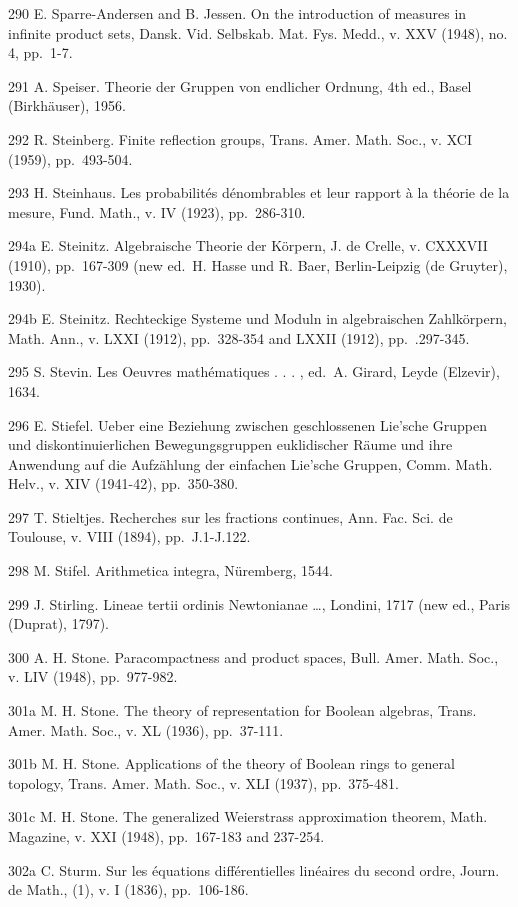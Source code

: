 290 E. Sparre-Andersen and B. Jessen. On the introduction of measures in infinite product sets, Dansk. Vid. Selbskab. Mat. Fys. Medd., v. XXV (1948), no. 4, pp.~1-7.

291 A. Speiser. Theorie der Gruppen von endlicher Ordnung, 4th ed., Basel (Birkhäuser), 1956.

292 R. Steinberg. Finite reflection groups, Trans. Amer. Math. Soc., v. XCI (1959), pp.~493-504.

293 H. Steinhaus. Les probabilités dénombrables et leur rapport à la théorie de la mesure, Fund. Math., v. IV (1923), pp.~286-310.

294a E. Steinitz. Algebraische Theorie der Körpern, J. de Crelle, v. CXXXVII (1910), pp.~167-309 (new ed.~H. Hasse und R. Baer, Berlin-Leipzig (de Gruyter), 1930).

294b E. Steinitz. Rechteckige Systeme und Moduln in algebraischen Zahlkörpern, Math. Ann., v. LXXI (1912), pp.~328-354 and LXXII (1912), pp.~.297-345.

295 S. Stevin. Les Oeuvres mathématiques . . . , ed.~A. Girard, Leyde (Elzevir), 1634.

296 E. Stiefel. Ueber eine Beziehung zwischen geschlossenen Lie'sche Gruppen und diskontinuierlichen Bewegungsgruppen euklidischer Räume und ihre Anwendung auf die Aufzählung der einfachen Lie'sche Gruppen, Comm. Math. Helv., v. XIV (1941-42), pp.~350-380.

297 T. Stieltjes. Recherches sur les fractions continues, Ann. Fac. Sci. de Toulouse, v. VIII (1894), pp.~J.1-J.122.

298 M. Stifel. Arithmetica integra, Nüremberg, 1544.

299 J. Stirling. Lineae tertii ordinis Newtonianae \ldots, Londini, 1717 (new ed., Paris (Duprat), 1797).

300 A. H. Stone. Paracompactness and product spaces, Bull. Amer. Math. Soc., v. LIV (1948), pp.~977-982.

301a M. H. Stone. The theory of representation for Boolean algebras, Trans. Amer. Math. Soc., v. XL (1936), pp.~37-111.

301b M. H. Stone. Applications of the theory of Boolean rings to general topology, Trans. Amer. Math. Soc., v. XLI (1937), pp.~375-481.

301c M. H. Stone. The generalized Weierstrass approximation theorem, Math. Magazine, v. XXI (1948), pp.~167-183 and 237-254.

302a C. Sturm. Sur les équations différentielles linéaires du second ordre, Journ. de Math., (1), v. I (1836), pp.~106-186.

